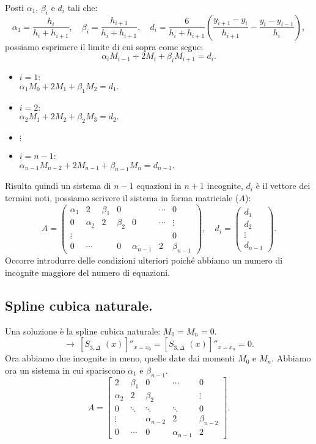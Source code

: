 Posti $\alpha_1$, $\beta_i$ e $d_i$ tali che:
\[
\alpha_1 = \frac{h_{i}}{h_{i}+h_{i+1}}, \quad\beta_i =\frac{h_{i+1}}{h_i+h_{i+1}},
\quad d_i = \frac{6}{h_{i}+h_{i+1}}\left(\frac{y_{i+1} -y_{i}}{h_{i+1}} - 
\frac{y_{i} -y_{i-1}}{h_{i}}\right),
\]
possiamo esprimere il limite di cui sopra come segue:
\[\alpha_i M_{i-1} + 2M_i + \beta_iM_{i+1} = d_i.\]

\begin{itemize}
\item[] $i = 1$:\\
$\alpha_1 M_0 + 2M_1 + \beta_1M_2 = d_1.$
\item[] $i = 2$:\\
$\alpha_2 M_1 + 2M_2 + \beta_2M_3 = d_2.$
\item[]$\vdots$
\item[]$i = n-1$:\\
$\alpha_{n-1} M_{n-2} + 2M_{n-1} + \beta_{n-1}M_{n} = d_{n-1}.$
\end{itemize}

Risulta quindi un sistema di $n-1$ equazioni in $n+1$ incognite, $d_i$ è il
vettore dei termini noti, possiamo scrivere il sistema in forma matriciale
($A$):
\[A = \left(
\begin{array}{ccccccc}
\alpha_1 & 2 & \beta_1 & 0 & &\cdots & 0 \\
0 & \alpha_2 & 2 & \beta_2 &0&\cdots & \vdots \\
\vdots & & & & & & 0\\
0 & \cdots & &0 &\alpha_{n-1} & 2& \beta_{n-1}
\end{array}
\right), \quad d_i =
\left(\begin{array}{c}
d_1 \\
d_2 \\
\vdots \\
d_{n-1}
\end{array}
\right).\]
Occorre introdurre delle condizioni ulteriori poiché abbiamo un numero di
incognite maggiore del numero di equazioni. 

\subsection{Spline cubica naturale.}
Una soluzione è la spline cubica
naturale: $M_0 = M_n = 0$.
\[
\longrightarrow \ \left[S_{3,\Delta}^{\phantom{(1)}}(x) \right]''_{x = x_0}
= \left[S_{3,\Delta}^{\phantom{(1)}}(x) \right]''_{x = x_n} = 0.
\]
Ora abbiamo due incognite in meno, quelle date dai momenti $M_0$ e $M_n$.
Abbiamo ora un sistema in cui spariscono $\alpha_1$ e $\beta_{n-1}$.
\[A = 
\left[
\begin{array}{ccccc}
 2 & \beta_1 & 0  &\cdots & 0 \\
\alpha_2 & 2 & \beta_2 & & \vdots \\
0 &\ddots &\ddots &\ddots &  0\\
\vdots & &\alpha_{n-2} & 2& \beta_{n-2}\\
0 & \cdots & 0 &\alpha_{n-1} & 2
\end{array}
\right].
\]

